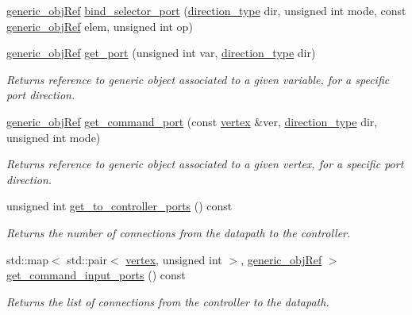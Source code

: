 \begin{DoxyCompactItemize}
\item 
\hyperlink{generic__obj_8hpp_acb533b2ef8e0fe72e09a04d20904ca81}{generic\+\_\+obj\+Ref} \hyperlink{classconn__binding_a723f7511cfb4dd34de9be43801fea518}{bind\+\_\+selector\+\_\+port} (\hyperlink{classconn__binding_af1575e7a7dc7acd00fc5c947f413c663}{direction\+\_\+type} dir, unsigned int mode, const \hyperlink{generic__obj_8hpp_acb533b2ef8e0fe72e09a04d20904ca81}{generic\+\_\+obj\+Ref} elem, unsigned int op)
\item 
\hyperlink{generic__obj_8hpp_acb533b2ef8e0fe72e09a04d20904ca81}{generic\+\_\+obj\+Ref} \hyperlink{classconn__binding_a0a23777374b0ac3c3c9811bbeb2c3137}{get\+\_\+port} (unsigned int var, \hyperlink{classconn__binding_af1575e7a7dc7acd00fc5c947f413c663}{direction\+\_\+type} dir)
\begin{DoxyCompactList}\small\item\em Returns reference to generic object associated to a given variable, for a specific port direction. \end{DoxyCompactList}\item 
\hyperlink{generic__obj_8hpp_acb533b2ef8e0fe72e09a04d20904ca81}{generic\+\_\+obj\+Ref} \hyperlink{classconn__binding_a24e43a95958793e3557d9d01626f37f6}{get\+\_\+command\+\_\+port} (const \hyperlink{graph_8hpp_abefdcf0544e601805af44eca032cca14}{vertex} \&ver, \hyperlink{classconn__binding_af1575e7a7dc7acd00fc5c947f413c663}{direction\+\_\+type} dir, unsigned int mode)
\begin{DoxyCompactList}\small\item\em Returns reference to generic object associated to a given vertex, for a specific port direction. \end{DoxyCompactList}\item 
unsigned int \hyperlink{classconn__binding_a61f18502e0796a50790c50cf2ed77e9f}{get\+\_\+to\+\_\+controller\+\_\+ports} () const
\begin{DoxyCompactList}\small\item\em Returns the number of connections from the datapath to the controller. \end{DoxyCompactList}\item 
std\+::map$<$ std\+::pair$<$ \hyperlink{graph_8hpp_abefdcf0544e601805af44eca032cca14}{vertex}, unsigned int $>$, \hyperlink{generic__obj_8hpp_acb533b2ef8e0fe72e09a04d20904ca81}{generic\+\_\+obj\+Ref} $>$ \hyperlink{classconn__binding_a71efbb9e5b43e9ae3978786144178b64}{get\+\_\+command\+\_\+input\+\_\+ports} () const
\begin{DoxyCompactList}\small\item\em Returns the list of connections from the controller to the datapath. \end{DoxyCompactList}\item 

\end{DoxyCompactItemize}
